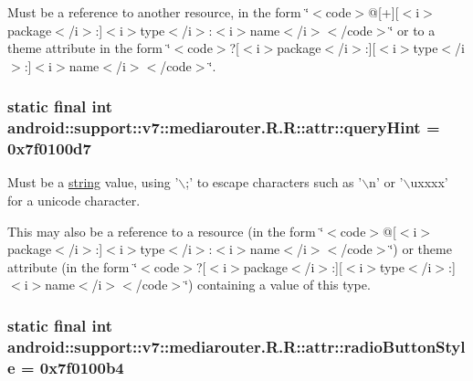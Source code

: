 Must be a reference to another resource, in the form \char`\"{}$<$code$>$@\mbox{[}+\mbox{]}\mbox{[}$<$i$>$package$<$/i$>$:\mbox{]}$<$i$>$type$<$/i$>$:$<$i$>$name$<$/i$>$$<$/code$>$\char`\"{} or to a theme attribute in the form \char`\"{}$<$code$>$?\mbox{[}$<$i$>$package$<$/i$>$:\mbox{]}\mbox{[}$<$i$>$type$<$/i$>$:\mbox{]}$<$i$>$name$<$/i$>$$<$/code$>$\char`\"{}. \hypertarget{classandroid_1_1support_1_1v7_1_1mediarouter_1_1_r_1_1attr_97e24b06a7a38a4ecf63ca591aac846f}{
\subsubsection[{queryHint}]{\setlength{\rightskip}{0pt plus 5cm}static final int android::support::v7::mediarouter.R.R::attr::queryHint = 0x7f0100d7}}
\label{classandroid_1_1support_1_1v7_1_1mediarouter_1_1_r_1_1attr_97e24b06a7a38a4ecf63ca591aac846f}


Must be a \hyperlink{classandroid_1_1support_1_1v7_1_1mediarouter_1_1_r_1_1string}{string} value, using '$\backslash$;' to escape characters such as '$\backslash$n' or '$\backslash$uxxxx' for a unicode character. 

This may also be a reference to a resource (in the form \char`\"{}$<$code$>$@\mbox{[}$<$i$>$package$<$/i$>$:\mbox{]}$<$i$>$type$<$/i$>$:$<$i$>$name$<$/i$>$$<$/code$>$\char`\"{}) or theme attribute (in the form \char`\"{}$<$code$>$?\mbox{[}$<$i$>$package$<$/i$>$:\mbox{]}\mbox{[}$<$i$>$type$<$/i$>$:\mbox{]}$<$i$>$name$<$/i$>$$<$/code$>$\char`\"{}) containing a value of this type. \hypertarget{classandroid_1_1support_1_1v7_1_1mediarouter_1_1_r_1_1attr_8530d29823946fb3adc66657a0502998}{
\subsubsection[{radioButtonStyle}]{\setlength{\rightskip}{0pt plus 5cm}static final int android::support::v7::mediarouter.R.R::attr::radioButtonStyle = 0x7f0100b4}}
\label{classandroid_1_1support_1_1v7_1_1mediarouter_1_1_r_1_1attr_8530d29823946fb3adc66657a0502998}


